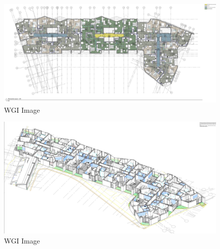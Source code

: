 \documentclass[
]{article}
\begin{document}
\begin{figure}[H]

{\centering \includegraphics{assets/WGI/WGI-BSC-plan1.jpg}

}

\caption{WGI Image}

\end{figure}%
\begin{figure}[H]

{\centering \includegraphics{assets/WGI/WGI-BSC-plan-iso1.jpg}

}

\caption{WGI Image}

\end{figure}%
\end{document}
